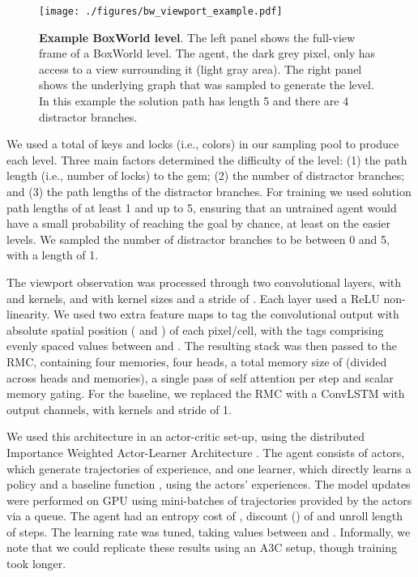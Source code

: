 \documentclass{article}
\begin{document}
\begin{figure}
    \centering
    \texttt{[image: ./figures/bw\_viewport\_example.pdf]}
    \caption{\textbf{Example BoxWorld level}. The left panel shows the full-view frame of a BoxWorld level. The agent, the dark grey pixel, only has access to a  view surrounding it (light gray area). The right panel shows the underlying graph that was sampled to generate the level. In this example the solution path has length 5 and there are 4 distractor branches.}
    \label{fig:boxworld}
\end{figure}

We used a total of  keys and  locks (i.e., colors) in our sampling pool to produce each level. Three main factors determined the difficulty of the level: (1) the path length (i.e., number of locks) to the gem; (2) the number of distractor branches; and (3) the path lengths of the distractor branches. For training we used solution path lengths of at least 1 and up to 5, ensuring that an untrained agent would have a small probability of reaching the goal by chance, at least on the easier levels. We sampled the number of distractor branches to be between 0 and 5, with a length of 1. 

The viewport observation was processed through two convolutional layers, with  and  kernels, and with  kernel sizes and a stride of . Each layer used a ReLU non-linearity. We used two extra feature maps to tag the convolutional output with absolute spatial position ( and ) of each pixel/cell, with the tags comprising evenly spaced values between  and . The resulting stack was then passed to the RMC, containing four memories, four heads, a total memory size of  (divided across heads and memories), a single pass of self attention per step and scalar memory gating. For the baseline, we replaced the RMC with a  ConvLSTM with  output channels, with  kernels and stride of 1.

We used this architecture in an actor-critic set-up, using the distributed Importance Weighted Actor-Learner Architecture \citep{espeholt2018impala}. The agent consists of  actors, which generate trajectories of experience, and one learner, which directly learns a policy  and a baseline function , using the actors' experiences. The model updates were performed on GPU using mini-batches of  trajectories provided by the actors via a queue. The agent had an entropy cost of , discount () of  and unroll length of  steps. The learning rate was tuned, taking values between  and . Informally, we note that we could replicate these results using an A3C setup, though training took longer. 
\end{document}
